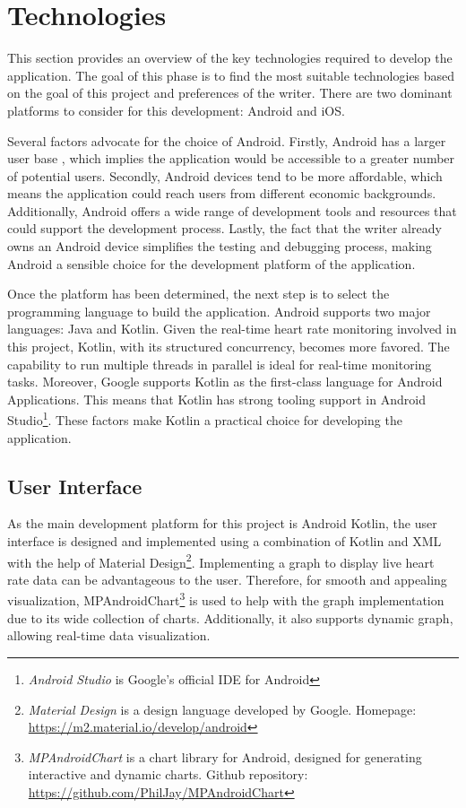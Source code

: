 \section{Technologies}
\label{chap:tech}
This section provides an overview of the key technologies required to develop the application. 
The goal of this phase is to find the most suitable technologies based on the goal of this project and preferences of the writer. 
There are two dominant platforms to consider for this development: Android and iOS.

Several factors advocate for the choice of Android. 
Firstly, Android has a larger user base \autocite{statcounter_os_market_share}, which implies the application would be accessible to a greater number of potential users. 
Secondly, Android devices tend to be more affordable, which means the application could reach users from different economic backgrounds.
Additionally, Android offers a wide range of development tools and resources that could support the development process.
Lastly, the fact that the writer already owns an Android device simplifies the testing and debugging process, making Android a sensible choice for the development platform of the application.

Once the platform has been determined, the next step is to select the programming language to build the application.
Android supports two major languages: Java and Kotlin. Given the real-time heart rate monitoring involved in this project, Kotlin, with its structured concurrency, becomes more favored. The capability to run multiple threads in parallel is ideal for real-time monitoring tasks.
Moreover, Google supports Kotlin as the first-class language for Android Applications. This means that Kotlin has strong tooling support in Android Studio\footnote{\emph{Android Studio} is Google's official IDE for Android}. \autocite{kotlin_android}
These factors make Kotlin a practical choice for developing the application.

\subsection{User Interface}
As the main development platform for this project is Android Kotlin, the user interface is designed and implemented using a combination of Kotlin and XML with the help of Material Design\footnote{\emph{Material Design} is a design language developed by Google. Homepage: \url{https://m2.material.io/develop/android}}.
Implementing a graph to display live heart rate data can be advantageous to the user. Therefore, for smooth and appealing visualization, MPAndroidChart\footnote{\emph{MPAndroidChart} is a chart library for Android, designed for generating interactive and dynamic charts. Github repository: \url{https://github.com/PhilJay/MPAndroidChart}} is used to help with the graph implementation due to its wide collection of charts. Additionally, it also supports dynamic graph, allowing real-time data visualization.
